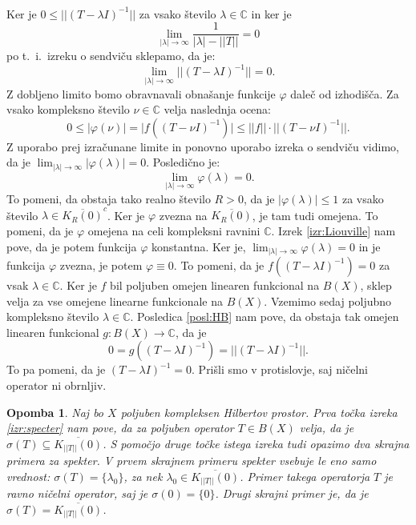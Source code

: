 \documentclass[12pt,a4paper,oneside,fleqn,openany]{book}
\newtheorem{opomba}[izrek]{Opomba}
\newcommand{\eopf}{\raisebox{0.8ex}{\framebox{}}} %
\newenvironment{dokaz}%
{\noindent{\bf Dokaz.}\ }%
{\hfill\eopf\par\bigskip}%
\newcommand{\C}{\mathbb{C}}
\newcommand{\abs}[1]{\ensuremath{\lvert #1 \rvert}}
\newcommand{\norm}[1]{\abs{\abs{#1}}}
\newcommand{\map}[3]{\ensuremath{{#1}:{#2}\rightarrow{#3}}}
\begin{document}
\begin{dokaz}
\begin{enumerate}[a)]
		Ker je $0 \leq \norm{(T- \lambda I)^{-1}}$ za vsako število $\lambda\in\C$ in ker je $$\lim_{\abs{\lambda}\to\infty}\frac{1}{\abs{\lambda} - \norm{T}}=0$$ po t.~i.~izreku o sendviču sklepamo, da je: $$\lim_{\abs{\lambda}\to\infty}\norm{(T- \lambda I)^{-1}} = 0.$$ Z dobljeno limito bomo obravnavali obnašanje funkcije $\varphi$ daleč od izhodišča. Za vsako kompleksno število $\nu\in\C$ velja naslednja ocena: $$0 \leq\abs{\varphi(\nu)} = \abs{f((T-\nu I)^{-1})} \leq \norm{f}\cdot\norm{(T-\nu I)^{-1}}.$$ Z uporabo prej izračunane limite in ponovno uporabo izreka o sendviču vidimo, da je $\lim_{\abs{\lambda}\to\infty}\abs{\varphi(\lambda)}=0$. Posledično je: $$\lim_{\abs{\lambda}\to\infty}\varphi(\lambda)=0.$$ To pomeni, da obstaja tako realno število $R>0$, da je $\abs{\varphi(\lambda)}\leq 1$ za vsako število $\lambda\in \overline{K_R(0)}^c$. Ker je $\varphi$ zvezna na $\overline{K_R(0)}$, je tam tudi omejena. To pomeni, da je $\varphi$ omejena na celi kompleksni ravnini $\C$.
		Izrek \ref{izr:Liouville} nam pove, da je potem funkcija $\varphi$ konstantna. Ker je, $\lim_{\abs{\lambda}\to\infty}\varphi(\lambda) = 0$ in je funkcija $\varphi$ zvezna, je potem $\varphi\equiv 0$. To pomeni, da je $f((T - \lambda I)^{-1})=0$ za vsak $\lambda\in\C$. Ker je $f$ bil poljuben omejen linearen funkcional na $B(X)$, sklep velja za vse omejene linearne funkcionale na $B(X)$. Vzemimo sedaj poljubno kompleksno število $\lambda\in\C$.
		Posledica \ref{posl:HB} nam pove, da obstaja tak omejen linearen funkcional $\map{g}{B(X)}{\C}$, da je $$0 = g((T- \lambda I)^{-1})=\norm{(T- \lambda I)^{-1}}.$$ To pa pomeni, da je $(T- \lambda I)^{-1} = 0$. Prišli smo v protislovje, saj ničelni operator ni obrnljiv.
	\end{enumerate}
\end{dokaz}

\begin{opomba}
	\label{opomb:specprimeri} Naj bo $X$ poljuben kompleksen Hilbertov prostor. Prva točka izreka \ref{izr:specter} nam pove, da za poljuben operator $T\in B(X)$ velja, da je $\sigma(T)\subseteq \overline{K_{\norm{T}}(0)}$. S pomočjo druge točke istega izreka tudi opazimo dva skrajna primera za spekter. V prvem skrajnem primeru spekter vsebuje le eno samo vrednost: $\sigma(T)=\{\lambda_0\}$, za nek $\lambda_0\in\overline{K_{\norm{T}}(0)}$. Primer takega operatorja $T$ je ravno ničelni operator, saj je $\sigma(0) = \{0\}$. Drugi skrajni primer je, da je $\sigma(T) = \overline{K_{\norm{T}}(0)}$.
\end{opomba}
\end{document}
